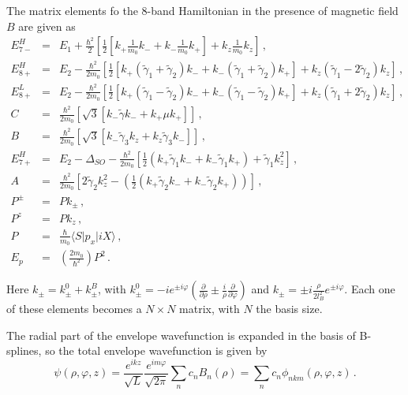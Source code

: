 \documentclass[12pt,a4paper]{article}
\begin{document}
The matrix elements fo the 8-band Hamiltonian in the presence of magnetic field $B$ are given as
\begin{eqnarray}
E_{7-}^H &=& E_1 + \frac{\hbar^2}{2}\left[\frac{1}{2}\left[k_+ \frac{1}{m_0} k_- + k_- \frac{1}{m_0} k_+ \right] + k_z \frac{1}{m_0} k_z \right]\,, \\
E_{8+}^H &=& E_2 - \frac{\hbar^2}{2m_0} \left[\frac{1}{2}\left[k_+(\tilde{\gamma}_1+\tilde{\gamma}_2) k_- + k_-(\tilde{\gamma}_1+\tilde{\gamma}_2) k_+ \right] + k_z(\tilde{\gamma}_1 -2 \tilde{\gamma}_2) k_z \right]\,, \\
E_{8+}^L &=& E_2 - \frac{\hbar^2}{2m_0} \left[\frac{1}{2}\left[k_+(\tilde{\gamma}_1-\tilde{\gamma}_2) k_- + k_-(\tilde{\gamma}_1-\tilde{\gamma}_2) k_+ \right] + k_z(\tilde{\gamma}_1 +2 \tilde{\gamma}_2) k_z \right]\,, \\
C &=& \frac{\hbar^2}{2m_0} \left[ \sqrt{3} \left[k_- \tilde{\gamma}k_- + k_+\mu k_+ \right] \right]\,, \\
B &=& \frac{\hbar^2}{2m_0} \left[ \sqrt{3} \left[k_- \tilde{\gamma}_3 k_z + k_z\tilde{\gamma}_3 k_- \right] \right]\,, \\
E_{7+}^H &=& E_2 - \Delta_{SO} - \frac{\hbar^2}{2 m_0}\left[\frac{1}{2}\left(k_+\tilde{\gamma}_1 k_- + k_-\tilde{\gamma}_1 k_+ \right) + \tilde{\gamma}_1 k_z^2 \right]\,, \\
A &=& \frac{\hbar^2}{2 m_0} \left[2\tilde{\gamma}_2 k_z^2 - \left(\frac{1}{2}\left(k_+\tilde{\gamma}_2 k_- + k_-\tilde{\gamma}_2 k_+ \right) \right) \right]\,, \\
P^{\pm} &=& P k_{\pm} \,, \\
P^z &=& P k_z \,, \\
P &=& \frac{\hbar}{m_0} \langle S\vert p_x\vert i X\rangle\,, \\
E_p &=& \left(\frac{2 m_0}{\hbar^2}\right) P^2\,.
\end{eqnarray}

\noindent
Here $k_{\pm} = k_{\pm}^0 + k_{\pm}^B$, with $k_{\pm}^0 = -i e^{\pm i \varphi}
\left(\frac{\partial}{\partial \rho} \pm \frac{i}{\rho}\frac{\partial}{\partial \varphi}\right)$
and $k_{\pm} = \pm i \frac{\rho}{2 l_B^2} e^{\pm i \varphi}$. Each one of these
elements becomes a $N\times N$ matrix, with $N$ the basis size.

The radial part of the envelope wavefunction is expanded in the basis of B-splines, so the total
envelope wavefunction is given by
\begin{equation}
\psi(\rho, \varphi, z) = \frac{e^{i k z}}{\sqrt{L}} \frac{e^{i m \varphi}}{\sqrt{2 \pi}} \sum_{n} c_n B_n(\rho) = \sum_{n} c_n \phi_{nkm}(\rho, \varphi, z)\,.
\end{equation}
\end{document}
